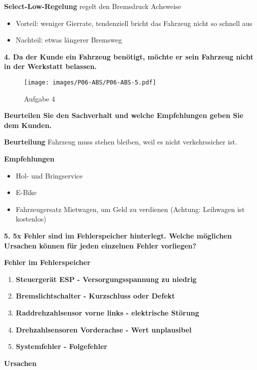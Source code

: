 \textbf{Select-Low-Regelung} regelt den Bremsdruck Achsweise

\begin{itemize}
\item
  Vorteil: weniger Gierrate, tendenziell bricht das Fahrzeug nicht so
  schnell aus
\item
  Nachteil: etwas längerer Bremsweg
\end{itemize}

\textbf{4. Da der Kunde ein Fahrzeug benötigt, möchte er sein Fahrzeug
nicht in der Werkstatt belassen.}

\begin{figure}[!ht]%
\centering
\texttt{[image: images/P06-ABS/P06-ABS-5.pdf]}
\caption{Aufgabe 4}
\end{figure}

\textbf{Beurteilen Sie den Sachverhalt und welche Empfehlungen geben Sie
dem Kunden.}

\textbf{Beurteilung} Fahrzeug muss stehen bleiben, weil es nicht
verkehrssicher ist.

\textbf{Empfehlungen}

\begin{itemize}
\item
  Hol- und Bringservice
\item
  E-Bike
\item
  Fahrzeugersatz Mietwagen, um Geld zu verdienen (Achtung: Leihwagen ist
  kostenlos)
\end{itemize}

\newpage

\textbf{5. 5x Fehler sind im Fehlerspeicher hinterlegt. Welche möglichen
Ursachen können für jeden einzelnen Fehler vorliegen?}

\textbf{Fehler im Fehlerspeicher}

\begin{enumerate}
\item
  \textbf{Steuergerät ESP - Versorgungsspannung zu niedrig}
\item
  \textbf{Bremslichtschalter - Kurzschluss oder Defekt}
\item
  \textbf{Raddrehzahlsensor vorne links - elektrische Störung}
\item
  \textbf{Drehzahlsensoren Vorderachse - Wert unplausibel}
\item
  \textbf{Systemfehler - Folgefehler}
\end{enumerate}

\textbf{Ursachen}

